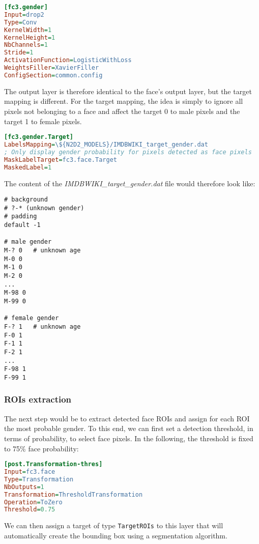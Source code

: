 \documentclass[a4paper,11pt,oneside]{article}
\begin{document}
\begin{lstlisting}[language=ini]
[fc3.gender]
Input=drop2
Type=Conv
KernelWidth=1
KernelHeight=1
NbChannels=1
Stride=1
ActivationFunction=LogisticWithLoss
WeightsFiller=XavierFiller
ConfigSection=common.config
\end{lstlisting}

The output layer is therefore identical to the face's output layer, but the
target mapping is different. For the target mapping, the idea is simply to
ignore all pixels not belonging to a face and affect the target 0 to male pixels
and the target 1 to female pixels.

\begin{lstlisting}[language=ini]
[fc3.gender.Target]
LabelsMapping=\${N2D2_MODELS}/IMDBWIKI_target_gender.dat
; Only display gender probability for pixels detected as face pixels
MaskLabelTarget=fc3.face.Target
MaskedLabel=1
\end{lstlisting}

The content of the \emph{IMDBWIKI\_target\_gender.dat} file would therefore look
like:

\begin{lstlisting}
# background
# ?-* (unknown gender)
# padding
default -1

# male gender
M-? 0   # unknown age
M-0 0
M-1 0
M-2 0
...
M-98 0
M-99 0

# female gender
F-? 1   # unknown age
F-0 1
F-1 1
F-2 1
...
F-98 1
F-99 1
\end{lstlisting}

\subsubsection{ROIs extraction}

The next step would be to extract detected face ROIs and assign for each ROI the
most probable gender. To this end, we can first set a detection threshold, in
terms of probability, to select face pixels. In the following, the threshold is
fixed to 75\% face probability:

\begin{lstlisting}[language=ini]
[post.Transformation-thres]
Input=fc3.face
Type=Transformation
NbOutputs=1
Transformation=ThresholdTransformation
Operation=ToZero
Threshold=0.75
\end{lstlisting}

We can then assign a target of type \lstinline!TargetROIs! to this layer that
will automatically create the bounding box using a segmentation algorithm.
\end{document}
